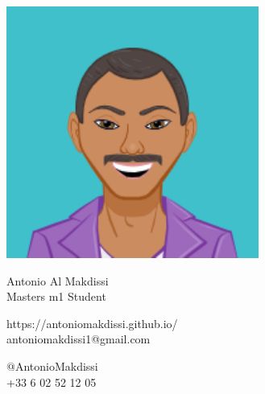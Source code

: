 \documentclass{article}
\begin{document}
\centering \includegraphics[width=.25\linewidth]{logo}\\[5pt]
\parbox{2in}{\Large \centering Antonio Al Makdissi\\[1pt]
\normalsize Masters m1 Student}

\vfill
\raggedright
\begin{multicols}{2}
https://antoniomakdissi.github.io/\\
antoniomakdissi1@gmail.com

\columnbreak
\raggedleft
@AntonioMakdissi\\
+33 6 02 52 12 05%
\end{multicols}%
\end{document}
